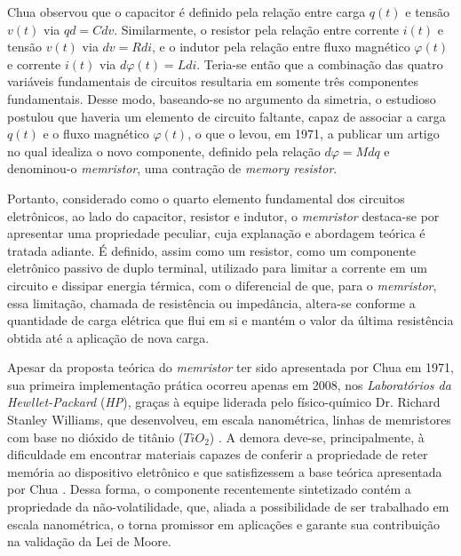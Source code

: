 \documentclass{ceel}
\begin{document}
\begin{multicols}{2}
Chua \cite{artigo} observou que o capacitor é definido pela relação entre carga $q(t)$ e tensão $v(t)$ via $qd=C dv$. Similarmente, o resistor pela relação entre corrente $i(t)$ e tensão $v(t)$ via $dv=R di$, e o indutor pela relação entre fluxo magnético $\varphi(t)$ e corrente $i(t)$ via $d\varphi(t)=L di$. Teria-se então que a combinação das quatro variáveis fundamentais de circuitos resultaria em somente três componentes fundamentais.
Desse modo, baseando-se no argumento da simetria, o estudioso postulou que haveria um elemento de circuito faltante, capaz de associar a carga $q(t)$ e o fluxo magnético $\varphi(t)$, o que o levou, em 1971, a publicar um artigo no qual idealiza o novo componente, definido pela relação $d\varphi=M dq$ e denominou-o \emph{memristor}, uma contração de \emph{memory resistor}. 

Portanto, considerado como o quarto elemento fundamental dos circuitos eletrônicos, ao lado do capacitor, resistor e indutor, o \emph{memristor} destaca-se por apresentar uma propriedade peculiar, cuja explanação e abordagem teórica é tratada adiante. É definido, assim como um resistor, como um componente eletrônico passivo de duplo terminal, utilizado para limitar a corrente em um circuito e dissipar energia térmica, com o diferencial de que, para o \emph{memristor}, essa limitação, chamada de resistência ou impedância, altera-se conforme a quantidade de carga elétrica que flui em si e mantém o valor da última resistência obtida até a aplicação de nova carga.

Apesar da proposta teórica do \emph{memristor} ter sido apresentada por Chua em 1971, sua primeira implementação prática ocorreu apenas em 2008, nos \emph{Laboratórios da Hewllet-Packard} (\emph{HP}), graças à equipe liderada pelo físico-químico Dr. Richard Stanley Williams, que desenvolveu, em escala nanométrica, linhas de memristores com base no dióxido de titânio ($TiO_2$) \cite{nature}. A demora deve-se, principalmente, à dificuldade em encontrar materiais capazes de conferir a propriedade de reter memória ao dispositivo eletrônico e que satisfizessem a base teórica apresentada por Chua \cite{artigo}.
Dessa forma, o componente recentemente sintetizado contém a propriedade da não-volatilidade, que, aliada a possibilidade de ser trabalhado em escala nanométrica, o torna promissor em aplicações e garante sua contribuição na validação da Lei de Moore.


\end{multicols}
\end{document}
